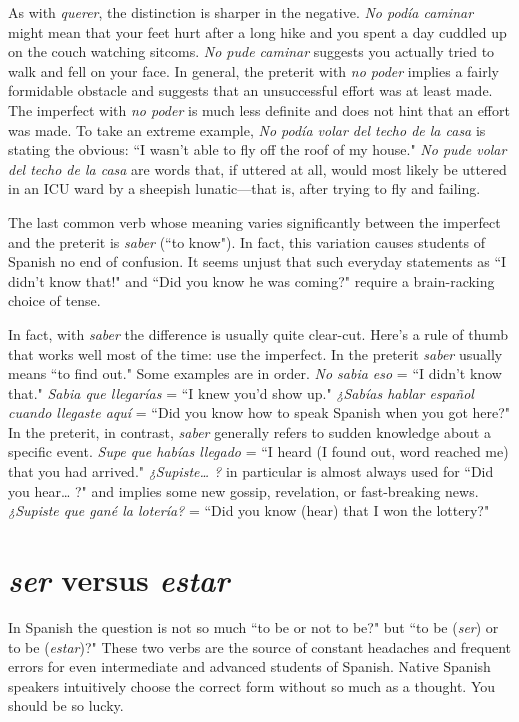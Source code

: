 As with \emph{querer}, the distinction is sharper in the negative. \emph{No
	podía caminar} might mean that your feet hurt after a long hike and
you spent a day cuddled up on the couch watching sitcoms. \emph{No pude
	caminar} suggests you actually tried to walk and fell on your face. In
general, the preterit with \emph{no poder} implies a fairly formidable obstacle
and suggests that an unsuccessful effort was at least made. The imperfect with \emph{no poder} is much less definite and does not hint that an effort was made. To take an extreme example, \emph{No podía volar del techo
	de la casa} is stating the obvious: ``I wasn't able to fly off the roof of my
house." \emph{No pude volar del techo de la casa} are words that, if uttered
at all, would most likely be uttered in an ICU ward by a sheepish lunatic---that is, after trying to fly and failing.

The last common verb whose meaning varies significantly
between the imperfect and the preterit is \emph{saber} (``to know"). In fact, this
variation causes students of Spanish no end of confusion. It seems unjust that such everyday statements as ``I didn't know that!" and ``Did
you know he was coming?" require a brain-racking choice of tense.

In fact, with \emph{saber} the difference is usually quite clear-cut.
Here's a rule of thumb that works well most of the time: use the imperfect. In the preterit \emph{saber} usually means ``to find out." Some examples are in order. \emph{No sabia eso} = ``I didn't know that." \emph{Sabia que
	llegarías} = ``I knew you'd show up." \emph{¿Sabías hablar español cuando
	llegaste aquí} = ``Did you know how to speak Spanish when you got
here?" In the preterit, in contrast, \emph{saber} generally refers to sudden
knowledge about a specific event. \emph{Supe que habías llegado} = ``I heard
(I found out, word reached me) that you had arrived." \emph{¿Supiste\ldots{} ?} in
particular is almost always used for ``Did you hear\ldots{} ?" and implies
some new gossip, revelation, or fast-breaking news. \emph{¿Supiste que gané
	la lotería?} = ``Did you know (hear) that I won the lottery?"

\section{\emph{ser} versus \emph{estar}}

In Spanish the question is not so much ``to be or not to be?"
but ``to be (\emph{ser}) or to be (\emph{estar})?" These two verbs are the source of
constant headaches and frequent errors for even intermediate and
advanced students of Spanish. Native Spanish speakers intuitively
choose the correct form without so much as a thought. You should
be so lucky.

